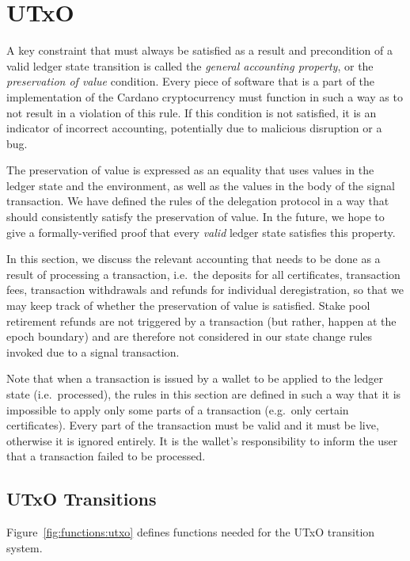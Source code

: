 \section{UTxO}
\label{sec:utxo}

A key constraint that must always be satisfied as a result and precondition of
a valid ledger state transition is called the \textit{general accounting
property}, or the \textit{preservation of value} condition. Every piece of
software that is a part of the implementation of the
Cardano cryptocurrency must function in such a way as to not result in
a violation of this rule.
If this condition is not satisfied, it is an indicator of
incorrect accounting, potentially due to
malicious disruption or a bug.

The preservation of value is expressed as an equality that uses values in
the ledger state and the environment, as well as the values in the body of
the signal transaction.
We have defined the rules of the delegation protocol in a way that should
consistently satisfy the preservation of value. In the future, we hope to
give a formally-verified proof that every \textit{valid} ledger state satisfies
this property.

In this section, we discuss the relevant accounting that needs to be done
as a result of processing a transaction, i.e.~the deposits for all certificates,
transaction fees, transaction withdrawals and refunds for individual
deregistration, so that we may keep track of whether the preservation of
value is satisfied. Stake pool retirement refunds are not triggered by a
transaction (but rather, happen at the epoch boundary) and are therefore
not considered in our state change rules invoked due to a signal transaction.

Note that when a transaction is issued by a wallet to be applied to the ledger
state (i.e.~processed), the rules in this section are defined in such a way that it is impossible to
apply only some parts of a transaction (e.g.~only certain certificates).
Every part of the transaction must be valid and it must be live, otherwise
it is ignored entirely. It is the wallet's responsibility to inform the user
that a transaction failed to be processed.

\subsection{UTxO Transitions}
\label{sec:utxo-trans}

Figure~\ref{fig:functions:utxo} defines functions needed for the UTxO transition system.

